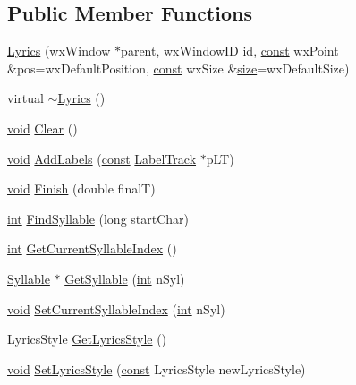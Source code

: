 \subsection*{Public Member Functions}
\begin{DoxyCompactItemize}
\item 
\hyperlink{class_lyrics_a48e44b9bfff5a386a368f80e5734aca1}{Lyrics} (wx\+Window $\ast$parent, wx\+Window\+ID id, \hyperlink{getopt1_8c_a2c212835823e3c54a8ab6d95c652660e}{const} wx\+Point \&pos=wx\+Default\+Position, \hyperlink{getopt1_8c_a2c212835823e3c54a8ab6d95c652660e}{const} wx\+Size \&\hyperlink{group__lavu__mem_ga854352f53b148adc24983a58a1866d66}{size}=wx\+Default\+Size)
\item 
virtual \hyperlink{class_lyrics_a207ab80e935a295c59a5c4c2c4f36ec3}{$\sim$\+Lyrics} ()
\item 
\hyperlink{sound_8c_ae35f5844602719cf66324f4de2a658b3}{void} \hyperlink{class_lyrics_a73c832028b80cb8a68d42a82a59b94ba}{Clear} ()
\item 
\hyperlink{sound_8c_ae35f5844602719cf66324f4de2a658b3}{void} \hyperlink{class_lyrics_aba719df567f4ae9934a85c5e7881f654}{Add\+Labels} (\hyperlink{getopt1_8c_a2c212835823e3c54a8ab6d95c652660e}{const} \hyperlink{class_label_track}{Label\+Track} $\ast$p\+LT)
\item 
\hyperlink{sound_8c_ae35f5844602719cf66324f4de2a658b3}{void} \hyperlink{class_lyrics_ae9b25288591a5834de1479e3c9e75e43}{Finish} (double finalT)
\item 
\hyperlink{xmltok_8h_a5a0d4a5641ce434f1d23533f2b2e6653}{int} \hyperlink{class_lyrics_a8814f6dca2b713111c0da252fbeeca9b}{Find\+Syllable} (long start\+Char)
\item 
\hyperlink{xmltok_8h_a5a0d4a5641ce434f1d23533f2b2e6653}{int} \hyperlink{class_lyrics_ab010edfac00895ee15bf7d0ccd704ec4}{Get\+Current\+Syllable\+Index} ()
\item 
\hyperlink{struct_syllable}{Syllable} $\ast$ \hyperlink{class_lyrics_a129d876127960557d784780a6437e71a}{Get\+Syllable} (\hyperlink{xmltok_8h_a5a0d4a5641ce434f1d23533f2b2e6653}{int} n\+Syl)
\item 
\hyperlink{sound_8c_ae35f5844602719cf66324f4de2a658b3}{void} \hyperlink{class_lyrics_ad39f0ef25df583b6cbaac462e0089f19}{Set\+Current\+Syllable\+Index} (\hyperlink{xmltok_8h_a5a0d4a5641ce434f1d23533f2b2e6653}{int} n\+Syl)
\item 
Lyrics\+Style \hyperlink{class_lyrics_a3fb610d607b75a6506b63f11312c64d6}{Get\+Lyrics\+Style} ()
\item 
\hyperlink{sound_8c_ae35f5844602719cf66324f4de2a658b3}{void} \hyperlink{class_lyrics_af9478f7f21585e3dd492da747a6fad71}{Set\+Lyrics\+Style} (\hyperlink{getopt1_8c_a2c212835823e3c54a8ab6d95c652660e}{const} Lyrics\+Style new\+Lyrics\+Style)

\end{DoxyCompactItemize}
